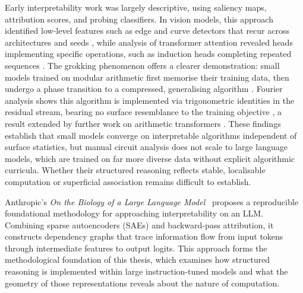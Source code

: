 Early interpretability work was largely descriptive, using saliency maps, attribution scores, and probing classifiers. In vision models, this approach identified low-level features such as edge and curve detectors that recur across architectures and seeds \citep{olah2020zoom}, while analysis of transformer attention revealed heads implementing specific operations, such as induction heads completing repeated sequences \citep{elhage2021mathematical}. The grokking phenomenon offers a clearer demonstration: small models trained on modular arithmetic first memorise their training data, then undergo a phase transition to a compressed, generalising algorithm \citep{power2022grokking}. Fourier analysis shows this algorithm is implemented via trigonometric identities in the residual stream, bearing no surface resemblance to the training objective \citep{nanda2023progress}, a result extended by further work on arithmetic transformers \citep{zhong2023clock, quirke2024understanding, quirkeneo2025understanding, musat2024clustering}.
These findings establish that small models converge on interpretable algorithms independent of surface statistics, but manual circuit analysis does not scale to large language models, which are trained on far more diverse data without explicit algorithmic curricula. Whether their structured reasoning reflects stable, localisable computation or superficial association remains difficult to establish.


Anthropic's \textit{On the Biology of a Large Language Model}~\cite{lindsey2025biology} proposes
a reproducible foundational methodology for approaching interpretability on an LLM.
Combining sparse autoencoders (SAEs) and backward-pass attribution,
it constructs dependency graphs that trace information flow from input tokens through intermediate
features to output logits. This approach forms the methodological foundation of this thesis, which
examines how structured reasoning is implemented within large instruction-tuned models and what
the geometry of those representations reveals about the nature of computation.

